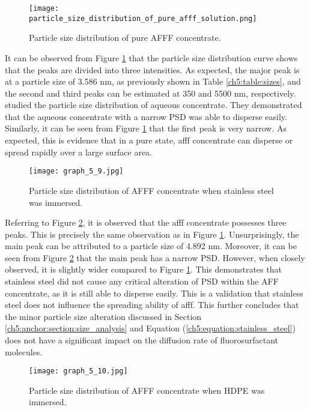 \begin{figure}[H]
    \centering
    \texttt{[image: particle\_size\_distribution\_of\_pure\_afff\_solution.png]}
    \caption{Particle size distribution of pure AFFF concentrate.}
    \label{ch5:figure:pure_afff}
\end{figure}

It can be observed from Figure \ref{ch5:figure:pure_afff} that the particle size distribution curve shows that the peaks are divided into three intensities. As expected, the major peak is at a particle size of 3.586 nm, as previously shown in Table \ref{ch5:table:sizes}, and the second and third peaks can be estimated at 350 and 5500 nm, respectively. \cite{de2017detection} studied the particle size distribution of aqueous concentrate. They demonstrated that the aqueous concentrate with a narrow PSD was able to disperse easily. Similarly, it can be seen from Figure \ref{ch5:figure:pure_afff} that the first peak is very narrow. As expected, this is evidence that in a pure state, \acrshort{afff} concentrate can disperse or spread rapidly over a large surface area.

\begin{figure}[H]
    \centering
    \texttt{[image: graph\_5\_9.jpg]}
    \caption{Particle size distribution of AFFF concentrate when stainless steel was immersed.}
    \label{ch5:figure:stainless_steel}
\end{figure}

Referring to Figure \ref{ch5:figure:stainless_steel}, it is observed that the \acrshort{afff} concentrate possesses three peaks. This is precisely the same observation as in Figure \ref{ch5:figure:pure_afff}. Unsurprisingly, the main peak can be attributed to a particle size of 4.892 nm. Moreover, it can be seen from Figure \ref{ch5:figure:stainless_steel} that the main peak has a narrow PSD. However, when closely observed, it is slightly wider compared to Figure \ref{ch5:figure:pure_afff}. This demonstrates that stainless steel did not cause any critical alteration of PSD within the AFF concentrate, as it is still able to disperse easily. This is a validation that stainless steel does not influence the spreading ability of \acrshort{afff}. This further concludes that the minor particle size alteration discussed in Section \ref{ch5:anchor:section:size_analysis} and Equation (\ref{ch5:equation:stainless_steel}) does not have a significant impact on the diffusion rate of fluorosurfactant molecules.   
  
\begin{figure}[H]
    \centering
    \texttt{[image: graph\_5\_10.jpg]}
    \caption{Particle size distribution of AFFF concentrate when HDPE was immersed.}
    \label{ch5:figure:hdpe}
\end{figure}


